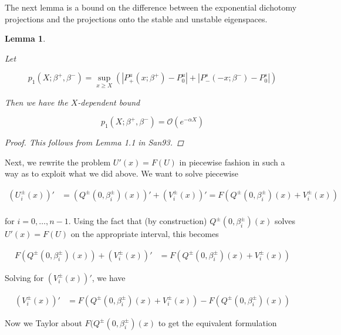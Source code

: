 \documentclass[12pt]{article}
\newtheorem{lemma}{Lemma}
\begin{document}
The next lemma is a bound on the difference between the exponential dichotomy projections and the projections onto the stable and unstable eigenspaces.


\begin{lemma}\label{p1}

Let 

\begin{equation}
p_1(X; \beta^+, \beta^-) = \sup_{x \geq X} (|P^u_+(x; \beta^+) - P_0^u| + |P^s_-(-x; \beta^-) - P_0^s|)
\end{equation}

Then we have the $X$-dependent bound

\begin{equation}
p_1(X; \beta^+, \beta^-) = \mathcal{O}(e^{-\alpha X})
\end{equation} 

\begin{proof}
This follows from Lemma 1.1 in San93.
\end{proof}

\end{lemma}


Next, we rewrite the problem $U'(x) = F(U)$ in piecewise fashion in such a way as to exploit what we did above. We want to solve piecewise

\begin{align*}
(U_i^\pm(x))' &= (Q^\pm(0, \beta_i^\pm)(x))' + (V_i^\pm(x))' = F\left(Q^\pm(0, \beta_i^\pm)(x) + V_i^\pm(x) \right) \\
\end{align*}

for $i = 0, \dots, n-1$. Using the fact that (by construction) $Q^\pm(0, \beta_i^\pm)(x)$ solves $U'(x) = F(U)$ on the appropriate interval, this becomes

\begin{align*}
F(Q^\pm(0, \beta_i^\pm)(x)) + (V_i^\pm(x))' &= F(Q^\pm(0, \beta_i^\pm)(x) + V_i^\pm(x) )
\end{align*}

Solving for $(V_i^\pm(x))'$, we have

\begin{align*}
(V_i^\pm(x))' &= F(Q^\pm(0, \beta_i^\pm)(x) + V_i^\pm(x) ) - F(Q^\pm(0, \beta_i^\pm)(x) )
\end{align*}

Now we Taylor about $F(Q^\pm(0, \beta_i^\pm)(x)$ to get the equivalent formulation
\end{document}
